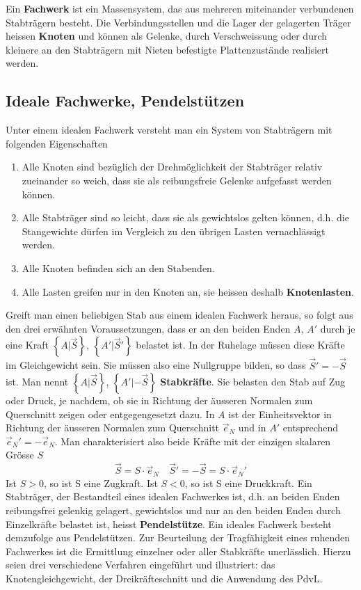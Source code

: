 Ein \textbf{Fachwerk} ist ein Massensystem, das aus mehreren miteinander verbundenen Stabträgern besteht. Die Verbindungsstellen und die Lager der gelagerten Träger heissen \textbf{Knoten} und können als Gelenke, durch Verschweissung oder durch kleinere an den Stabträgern mit Nieten befestigte Plattenzustände realisiert werden. 
\subsection{Ideale Fachwerke, Pendelstützen}
Unter einem idealen Fachwerk versteht man ein System von Stabträgern mit folgenden Eigenschaften
\begin{enumerate}[$(a)$]
\item Alle Knoten sind bezüglich der Drehmöglichkeit der Stabträger relativ zueinander so weich, dass sie als reibungsfreie Gelenke aufgefasst werden können.
\item Alle Stabträger sind so leicht, dass sie als gewichtslos gelten können, d.h. die Stangewichte dürfen im Vergleich zu den übrigen Lasten vernachlässigt werden.
\item Alle Knoten befinden sich an den Stabenden.
\item Alle Lasten greifen nur in den Knoten an, sie heissen deshalb \textbf{Knotenlasten}.
\end{enumerate}
Greift man einen beliebigen Stab aus einem idealen Fachwerk heraus, so folgt aus den drei erwähnten Voraussetzungen, dass er an den beiden Enden $A$, $A'$ durch je eine Kraft $\left\{A | \overrightarrow{S}\right\}$, $\left\{A' | \overrightarrow{S}'\right\}$ belastet ist. In der Ruhelage müssen diese Kräfte im Gleichgewicht sein. Sie müssen also eine Nullgruppe bilden, so dass $\overrightarrow{S}'=-\overrightarrow{S}$ ist. Man nennt $\left\{A | \overrightarrow{S}\right\}$, $\left\{A' | -\overrightarrow{S}\right\}$ \textbf{Stabkräfte}. Sie belasten den Stab auf Zug oder Druck, je nachdem, ob sie in Richtung der äusseren Normalen zum Querschnitt zeigen oder entgegengesetzt dazu. In $A$ ist der Einheitsvektor in Richtung der äusseren Normalen zum Querschnitt $\overrightarrow{e}_N$ und in $A'$ entsprechend $\overrightarrow{e}_N'=-\overrightarrow{e}_N$. Man charakterisiert also beide Kräfte mit der einzigen skalaren Grösse $S$
\begin{equation}
\boxed{\overrightarrow{S}=S\cdot \overrightarrow{e}_N}\quad \boxed{\overrightarrow{S}'=-\overrightarrow{S}=S\cdot \overrightarrow{e}_N'}
\end{equation}
Ist $S>0$, so ist S eine Zugkraft. Ist $S<0$, so ist S eine Druckkraft. Ein Stabträger, der Bestandteil eines idealen Fachwerkes ist, d.h. an beiden Enden reibungsfrei gelenkig gelagert, gewichtslos und nur an den beiden Enden durch Einzelkräfte belastet ist, heisst \textbf{Pendelstütze}. Ein ideales Fachwerk besteht demzufolge aus Pendelstützen.
\newline\newline
Zur Beurteilung der Tragfähigkeit eines ruhenden Fachwerkes ist die Ermittlung einzelner oder aller Stabkräfte unerlässlich. Hierzu seien drei verschiedene Verfahren eingeführt und illustriert: das Knotengleichgewicht, der Dreikräfteschnitt und die Anwendung des PdvL.
